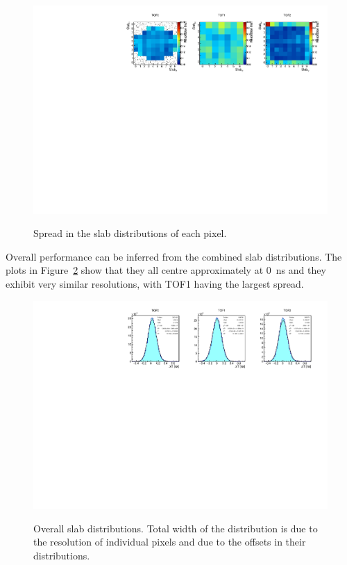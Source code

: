 \begin{figure}
  \begin{center}
  \includegraphics[width=15cm]{06_slab_dt_resolution_by_pixel_2d} \\
  \caption{Spread in the slab \DT{} distributions of each pixel.}
  \label{fig:SlabDTresByPixel}
  \end{center}
\end{figure}

Overall performance can be inferred from the combined slab \DT{}
distributions. The plots in Figure~\ref{fig:SlabDtAll} show that they all centre
approximately at 0~ns and they exhibit very similar resolutions, with TOF1
having the largest spread.


\begin{figure}
  \begin{center}
  \includegraphics[width=15cm]{07_overall_slab_dt} \\
  \caption{Overall slab \DT{} distributions. Total width of the
    distribution is due to the resolution of individual pixels and due to
    the offsets in their \DT{} distributions.}
  \label{fig:SlabDtAll}
  \end{center}
\end{figure}

